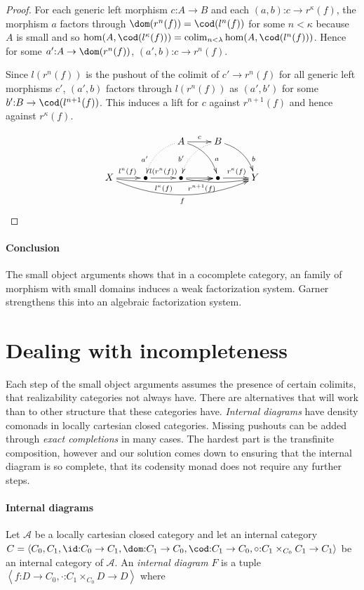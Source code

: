 \documentclass{tac}
\newcommand\cat\mathcal
\newcommand\of{\mathord:}
\newcommand\colim{\mathop{\mathrm{colim}}}
\newcommand\tuplet[1]{\left\langle #1 \right\rangle}
\begin{document}
\begin{proof}
For each generic left morphism $c\of A \to B$ and each $(a,b)\of c\to r^\kappa(f)$, the morphism $a$ factors through $\dom(r^n(f)) = \cod(l^n(f))$ for some $n<\kappa$ because $A$ is small and so $\hom(A,\cod(l^\kappa(f))) =\colim_{n<\lambda} \hom(A,\cod(l^n(f)))$.
Hence for some $a'\of A\to \dom(r^n(f))$, $(a',b)\of c\to r^n(f)$.

Since $l(r^n(f))$ is the pushout of the colimit of $c'\to r^n(f)$ for all generic left morphisms $c'$, $(a',b)$ factors through $l(r^n(f))$ as $(a',b')$ for some $b'\of B \to \cod(l^{n+1}(f))$. This induces a lift for $c$ against $r^{n+1}(f)$ and hence against $r^\kappa(f)$.

\[\xymatrix{
&& A\ar[r]^{c}\ar@/^2ex/[dr]^(.7)a\ar@{.>}@/_2ex/[dl]_(.7){a'} & B\ar@/^2ex/[dr]^(.7)b\ar@{.>}@/_2ex/[dl]_(.7){b'} \\
X \ar[r]^{l^n(f)} \ar@/_1ex/[rrr]_{l^{\kappa}(f)} \ar@/_4ex/[rrrr]_{f} & \bullet \ar[r]^{l(r^n(f))}  & \bullet \ar[r]\ar@/_1ex/[rr]_(.3){r^{n+1}(f)} & \bullet \ar[r]^{r^\kappa(f)} & Y
}\]
\end{proof}

\paragraph{Conclusion}
The small object arguments shows that in a cocomplete category, an family of morphism with small domains induces a weak factorization system. Garner %
strengthens this into an algebraic factorization system.

\section{Dealing with incompleteness}
Each step of the small object arguments assumes the presence of certain colimits, that realizability categories not always have. There are alternatives that will work than to other structure that these categories have.
 \emph{Internal diagrams} have density comonads in locally cartesian closed categories. %
 Missing pushouts can be added through \emph{exact completions} in many cases.
The hardest part is the transfinite composition, however and our solution comes down to ensuring that the internal diagram is so complete, that its codensity monad does not require any further steps.

\paragraph{Internal diagrams}
\begin{definition} Let $\cat A$ be a locally cartesian closed category and let an internal category $C = \tuplet{C_0,C_1,\id\of C_0\to C_1,\dom\of C_1\to C_0,\cod\of C_1\to C_0,\circ\of C_1\times_{C_0}C_1\to C_1}$ be an internal category of $\cat A$. An \emph{internal diagram} $F$ is a tuple $\tuplet{f\of D\to C_0, \cdot\of C_1\times_{C_0} D\to D}$ where %
\end{definition}
\end{document}
